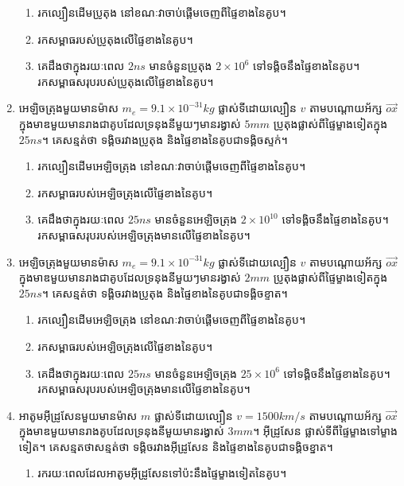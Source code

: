 \documentclass[12pt, a4paper]{article}
\begin{document}
\begin{enumerate}[m]
	\begin{enumerate}[k]
		\item រកល្បឿនដើមប្រូតុង នៅខណៈវាចាប់ផ្តើមចេញពីផ្ទៃខាងនៃគូប។
		\item រកសម្ពាធរបស់ប្រូតុងលើផ្ទៃខាងនៃគូប។
		\item គេដឹងថាក្នុងរយៈពេល $2ns$ មានចំនួនប្រូតុង $2\times10^{6}$ ទៅទង្គិចនឹងផ្ទៃខាងនៃគូប។ រកសម្ពាធសរុបរបស់ប្រូតុងលើផ្ទៃខាងនៃគូប។
	\end{enumerate}
	\item អេឡិចត្រុងមួយមានម៉ាស $m_{e}=9.1\times10^{-31}kg$ ផ្លាស់ទីដោយល្បឿន $v$ តាមបណ្តោយអ័ក្ស $\overrightarrow{ox}$ ក្នុងមាឌមួយមានរាងជាគូបដែលទ្រនុងនីមួយៗមានរង្វាស់ $5mm$ ប្រូតុងផ្លាស់ពីផ្ទៃម្ខាងទៀតក្នុង $25ns$។ គេសន្មត់ថា ទង្គិចរវាងប្រូតុង និងផ្ទៃខាងនៃគូបជាទង្គិចស្ទក់។
	\begin{enumerate}[k]
		\item រកល្បឿនដើមអេឡិចត្រុង នៅខណៈវាចាប់ផ្តើមចេញពីផ្ទៃខាងនៃគូប។
		\item រកសម្ពាធរបស់អេឡិចត្រុងលើផ្ទៃខាងនៃគូប។
		\item គេដឹងថាក្នុងរយៈពេល $25ns$ មានចំនួនអេឡិចត្រុង $2\times10^{10}$ ទៅទង្គិចនឹងផ្ទៃខាងនៃគូប។\\ រកសម្ពាធសរុបរបស់អេឡិចត្រុងមានលើផ្ទៃខាងនៃគូប។
	\end{enumerate}
	\item អេឡិចត្រុងមួយមានម៉ាស $m_{e}=9.1\times10^{-31}kg$ ផ្លាស់ទីដោយល្បឿន $v$ តាមបណ្តោយអ័ក្ស $\overrightarrow{ox}$ ក្នុងមាឌមួយមានរាងជាគូបដែលទ្រនុងនីមួយៗមានរង្វាស់ $2mm$ ប្រូតុងផ្លាស់ពីផ្ទៃម្ខាងទៀតក្នុង $25ns$។ គេសន្មត់ថា ទង្គិចរវាងប្រូតុង និងផ្ទៃខាងនៃគូបជាទង្គិចខ្ទាត។
	\begin{enumerate}[k]
		\item រកល្បឿនដើមអេឡិចត្រុង នៅខណៈវាចាប់ផ្តើមចេញពីផ្ទៃខាងនៃគូប។
	\item រកសម្ពាធរបស់អេឡិចត្រុងលើផ្ទៃខាងនៃគូប។
		\item គេដឹងថាក្នុងរយៈពេល $25ns$ មានចំនួនអេឡិចត្រុង $25\times10^{6}$ ទៅទង្គិចនឹងផ្ទៃខាងនៃគូប។\\ រកសម្ពាធសរុបរបស់អេឡិចត្រុងមានលើផ្ទៃខាងនៃគូប។
	\end{enumerate}
	\item អាតូមអុីដ្រូសែនមួយមានម៉ាស $m$ ផ្លាស់ទីដោយល្បឿន $v=1500km/s$ តាមបណ្តោយអ័ក្ស $\overrightarrow{ox}$ ក្នុងមាឌមួយមានរាងគូបដែលទ្រនុងនីមួយមានរង្វាស់ $3mm$។ អុីដ្រូសែន ផ្លាស់ទីពីផ្ទៃម្ខាងទៅម្ខាងទៀត។ គេសន្មតថាសន្មត់ថា ទង្គិចរវាងអុីដ្រូសែន និងផ្ទៃខាងនៃគូបជាទង្គិចខ្នាត។
	\begin{enumerate}[k]
		\item រករយៈពេលដែលអាតូមអុីដ្រូសែនទៅប៉ះនឹងផ្ទៃម្ខាងទៀតនៃគូប។

\end{enumerate}
\end{enumerate}
\end{document}
